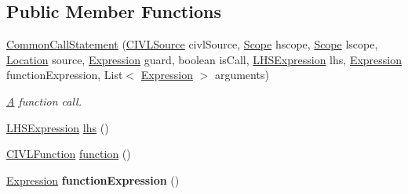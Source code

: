 \subsection*{Public Member Functions}
\begin{DoxyCompactItemize}
\item 
\hyperlink{classedu_1_1udel_1_1cis_1_1vsl_1_1civl_1_1model_1_1common_1_1statement_1_1CommonCallStatement_a718b25f394a49b0717d2b6f86b226de1}{Common\+Call\+Statement} (\hyperlink{interfaceedu_1_1udel_1_1cis_1_1vsl_1_1civl_1_1model_1_1IF_1_1CIVLSource}{C\+I\+V\+L\+Source} civl\+Source, \hyperlink{interfaceedu_1_1udel_1_1cis_1_1vsl_1_1civl_1_1model_1_1IF_1_1Scope}{Scope} hscope, \hyperlink{interfaceedu_1_1udel_1_1cis_1_1vsl_1_1civl_1_1model_1_1IF_1_1Scope}{Scope} lscope, \hyperlink{interfaceedu_1_1udel_1_1cis_1_1vsl_1_1civl_1_1model_1_1IF_1_1location_1_1Location}{Location} source, \hyperlink{interfaceedu_1_1udel_1_1cis_1_1vsl_1_1civl_1_1model_1_1IF_1_1expression_1_1Expression}{Expression} guard, boolean is\+Call, \hyperlink{interfaceedu_1_1udel_1_1cis_1_1vsl_1_1civl_1_1model_1_1IF_1_1expression_1_1LHSExpression}{L\+H\+S\+Expression} lhs, \hyperlink{interfaceedu_1_1udel_1_1cis_1_1vsl_1_1civl_1_1model_1_1IF_1_1expression_1_1Expression}{Expression} function\+Expression, List$<$ \hyperlink{interfaceedu_1_1udel_1_1cis_1_1vsl_1_1civl_1_1model_1_1IF_1_1expression_1_1Expression}{Expression} $>$ arguments)
\begin{DoxyCompactList}\small\item\em \hyperlink{structA}{A} function call. \end{DoxyCompactList}\item 
\hyperlink{interfaceedu_1_1udel_1_1cis_1_1vsl_1_1civl_1_1model_1_1IF_1_1expression_1_1LHSExpression}{L\+H\+S\+Expression} \hyperlink{classedu_1_1udel_1_1cis_1_1vsl_1_1civl_1_1model_1_1common_1_1statement_1_1CommonCallStatement_a4f467288197f9a65a6284d240ff5fd29}{lhs} ()
\item 
\hyperlink{interfaceedu_1_1udel_1_1cis_1_1vsl_1_1civl_1_1model_1_1IF_1_1CIVLFunction}{C\+I\+V\+L\+Function} \hyperlink{classedu_1_1udel_1_1cis_1_1vsl_1_1civl_1_1model_1_1common_1_1statement_1_1CommonCallStatement_a9a4cad34320d6a01b85ec35887404aac}{function} ()
\item 
\hypertarget{classedu_1_1udel_1_1cis_1_1vsl_1_1civl_1_1model_1_1common_1_1statement_1_1CommonCallStatement_a46fbfae7f47c05eabbef5d526e050c93}{}\hyperlink{interfaceedu_1_1udel_1_1cis_1_1vsl_1_1civl_1_1model_1_1IF_1_1expression_1_1Expression}{Expression} {\bfseries function\+Expression} ()\label{classedu_1_1udel_1_1cis_1_1vsl_1_1civl_1_1model_1_1common_1_1statement_1_1CommonCallStatement_a46fbfae7f47c05eabbef5d526e050c93}


\end{DoxyCompactItemize}
